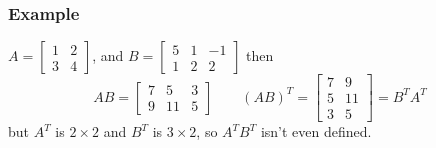 \begin{frame}[fragile]\frametitle{Example}
  
$A = \begin{bmatrix} 1 & 2 \\ 3 & 4 \end{bmatrix}$, and $B= 
\begin{bmatrix}
 5 & 1 & -1 \\
 1 & 2 & 2 
\end{bmatrix}$
then 
\[
 AB = \begin{bmatrix}
       7 & 5 & 3 \\
       9 & 11 & 5
      \end{bmatrix}
\qquad 
(AB)^T = \begin{bmatrix} 7 & 9 \\
          5 & 11 \\ 3 & 5
         \end{bmatrix} = B^T A^T
\]
but $A^T$ is $2\times 2$ and $B^T$ is $3 \times 2$, so $A^TB^T$ isn't even defined.

\end{frame}


